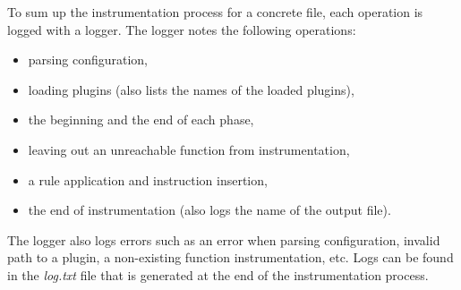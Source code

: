 To sum up the instrumentation process for a concrete file, each operation is
logged with a logger. The logger notes the following operations:
\begin{itemize}
  \item parsing configuration,
  \item loading plugins (also lists the names of the loaded plugins),
  \item the beginning and the end of each phase,
  \item leaving out an unreachable function from instrumentation,
  \item a rule application and instruction insertion,
  \item the end of instrumentation (also logs the name of the output file).
\end{itemize}
The logger also logs errors such as an error when parsing configuration,
invalid path to a plugin, a non-existing function instrumentation, etc. Logs
can be found in the \emph{log.txt} file that is generated at the end of the
instrumentation process.


